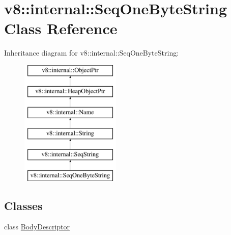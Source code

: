 \hypertarget{classv8_1_1internal_1_1SeqOneByteString}{}\section{v8\+:\+:internal\+:\+:Seq\+One\+Byte\+String Class Reference}
\label{classv8_1_1internal_1_1SeqOneByteString}
Inheritance diagram for v8\+:\+:internal\+:\+:Seq\+One\+Byte\+String\+:\begin{figure}[H]
\begin{center}
\leavevmode
\includegraphics[height=6.000000cm]{classv8_1_1internal_1_1SeqOneByteString}
\end{center}
\end{figure}
\subsection*{Classes}
\begin{DoxyCompactItemize}
\item 
class \mbox{\hyperlink{classv8_1_1internal_1_1SeqOneByteString_1_1BodyDescriptor}{Body\+Descriptor}}
\end{DoxyCompactItemize}

